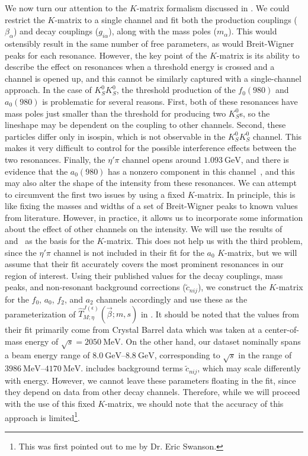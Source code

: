 We now turn our attention to the $K$-matrix formalism discussed in . We could restrict the $K$-matrix to a single channel and fit both the production couplings ($\beta_\alpha$) and decay couplings ($g_{i\alpha}$), along with the mass poles ($m_\alpha$). This would ostensibly result in the same number of free parameters, as would Breit-Wigner peaks for each resonance. However, the key point of the $K$-matrix is its ability to describe the effect on resonances when a threshold energy is crossed and a channel is opened up, and this cannot be similarly captured with a single-channel approach. In the case of $K_S^0K_S^0$, the threshold production of the $f_0(980)$ and $a_0(980)$ is problematic for several reasons. First, both of these resonances have mass poles just smaller than the threshold for producing two $K_S^0$s, so the lineshape may be dependent on the coupling to other channels. Second, these particles differ only in isospin, which is not observable in the $K_S^0K_S^0$ channel. This makes it very difficult to control for the possible interference effects between the two resonances. Finally, the $\eta'\pi$ channel opens around $\SI{1.093}{\giga\electronvolt}$, and there is evidence that the $a_0(980)$ has a nonzero component in this channel~\cite{Ablikim2017,Chen2020}, and this may also alter the shape of the intensity from these resonances. We can attempt to circumvent the first two issues by using a fixed $K$-matrix. In principle, this is like fixing the masses and widths of a set of Breit-Wigner peaks to known values from literature. However, in practice, it allows us to incorporate some information about the effect of other channels on the intensity. We will use the results of~\cite{Albrecht2020} and~\cite{Kopf2021} as the basis for the $K$-matrix. This does not help us with the third problem, since the $\eta'\pi$ channel is not included in their fit for the $a_0$ $K$-matrix, but we will assume that their fit accurately covers the most prominent resonances in our region of interest. Using their published values for the decay couplings, mass peaks, and non-resonant background corrections ($\tilde{c}_{nij}$), we construct the $K$-matrix for the $f_0$, $a_0$, $f_2$, and $a_2$ channels accordingly and use these as the parameterization of $\hat{T}_{M;\eta}^{J(\epsilon)}(\vec{\beta};m,s)$ in . It should be noted that the values from their fit primarily come from Crystal Barrel data which was taken at a center-of-mass energy of $\sqrt{s} = \SI{2050}{\mega\electronvolt}$. On the other hand, our dataset nominally spans a beam energy range of $\qtyrange{8.0}{8.8}{\giga\electronvolt}$, corresponding to $\sqrt{s}$ in the range of $\qtyrange{3986}{4170}{\mega\electronvolt}$.  includes background terms $\tilde{c}_{nij}$, which may scale differently with energy. However, we cannot leave these parameters floating in the fit, since they depend on data from other decay channels. Therefore, while we will proceed with the use of this fixed $K$-matrix, we should note that the accuracy of this approach is limited\footnote{This was first pointed out to me by Dr. Eric Swanson.}.

